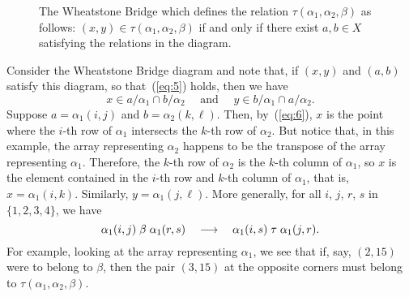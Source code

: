 \begin{figure}
  \caption{The Wheatstone Bridge which defines the relation 
    $\tau(\alpha_1, \alpha_2, \beta)$ as follows: 
    $(x,y) \in \tau(\alpha_1, \alpha_2, \beta)$ if and only if there 
    exist $a, b \in X$ satisfying the relations in the diagram.}
  \label{fig:rhoagain}
\end{figure}

Consider the Wheatstone Bridge diagram and note that, if 
$(x,y)$ and $(a, b)$ satisfy this diagram, so that~(\ref{eq:5}) holds, then  we have
\begin{equation}
\label{eq:6}  
x \in a/\alpha_1 \cap b/\alpha_2 \quad \text{ and } \quad 
y \in b/\alpha_1 \cap a/\alpha_2.
\end{equation}
Suppose $a = \alpha_1(i,j)$ and $b = \alpha_2(k,\ell)$.  Then, by~(\ref{eq:6}),  $x$ is the
point where the $i$-th row of $\alpha_1$ intersects the $k$-th row of
$\alpha_2$.  But notice that, in this example, the array representing $\alpha_2$
happens to be the transpose of the array representing $\alpha_1$.  Therefore,
the $k$-th row of $\alpha_2$ is the $k$-th column of $\alpha_1$, so $x$ is
the element contained in the $i$-th row and $k$-th column of $\alpha_1$, that is, 
$x = \alpha_1(i,k)$. Similarly, $y = \alpha_1(j,\ell)$.  More generally, for all
$i$, $j$, $r$, $s$ in $\{1, 2, 3, 4\}$, we have
\[
\alpha_1(i,j) \mathrel{\beta} \alpha_1(r,s) \quad \longrightarrow \quad 
\alpha_1(i,s) \mathrel{\tau} \alpha_1(j,r).
\]
For example, looking at the array representing $\alpha_1$, we see that if, say,
$(2,15)$ were to belong to $\beta$, then the pair $(3,15)$ at 
the opposite corners must belong to $\tau(\alpha_1, \alpha_2, \beta)$.


